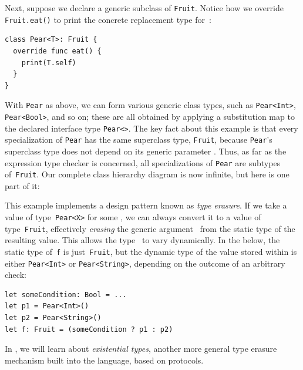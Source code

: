 \documentclass[../generics]{subfiles}
\begin{document}
\begin{example}
Next, suppose we declare a generic subclass of \texttt{Fruit}. Notice how we override \texttt{Fruit.eat()} to print the concrete replacement type for~\rT:
\begin{Verbatim}
class Pear<T>: Fruit {
  override func eat() {
    print(T.self)
  }
}
\end{Verbatim}
With \texttt{Pear} as above, we can form various generic class types, such as \texttt{Pear<Int>}, \texttt{Pear<Bool>}, and so on; these are all obtained by applying a substitution map to the declared interface type \texttt{Pear<\rT>}. The key fact about this example is that every specialization of \texttt{Pear} has the same superclass type, \texttt{Fruit}, because \texttt{Pear}'s superclass type does not depend on its generic parameter \rT. Thus, as far as the expression type checker is concerned, all specializations of \texttt{Pear} are subtypes of~\texttt{Fruit}. Our complete class hierarchy diagram is now infinite, but here is one part of it:
\begin{center}
\end{center}
This example implements a design pattern known as \emph{type erasure}. If we take a value of type~\texttt{Pear<X>} for some \tX, we can always convert it to a value of type~\texttt{Fruit}, effectively \emph{erasing} the generic argument \tX\ from the static type of the resulting value. This allows the type \tX\ to vary dynamically. In the below, the static type of~\texttt{f} is just~\texttt{Fruit}, but the dynamic type of the value stored within is either \texttt{Pear<Int>} or \texttt{Pear<String>}, depending on the outcome of an arbitrary check:
\begin{Verbatim}
let someCondition: Bool = ...
let p1 = Pear<Int>()
let p2 = Pear<String>()
let f: Fruit = (someCondition ? p1 : p2)
\end{Verbatim}
In , we will learn about \emph{existential types}, another more general type erasure mechanism built into the language, based on protocols.
\end{example}
\end{document}
